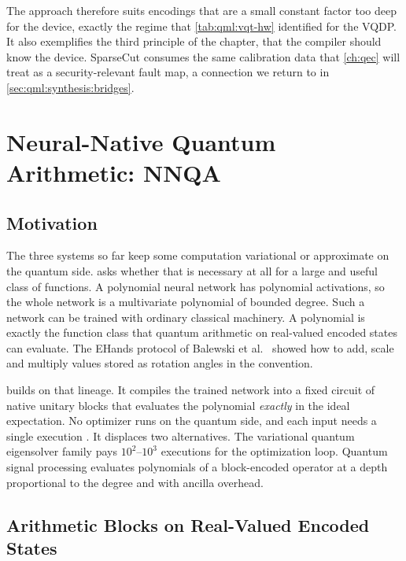 The approach therefore suits encodings that are a small constant factor too deep for the device, exactly the regime that \cref{tab:qml:vqt-hw} identified for the VQDP. It also exemplifies the third principle of the chapter, that the compiler should know the device. SparseCut consumes the same calibration data that \cref{ch:qec} will treat as a security-relevant fault map, a connection we return to in \cref{sec:qml:synthesis:bridges}.

\section{Neural-Native Quantum Arithmetic: NNQA}\label{sec:qml:nnqa}

\subsection{Motivation}\label{sec:qml:nnqa:motivation}

The three systems so far keep some computation variational or approximate on the quantum side. \nnqa{} asks whether that is necessary at all for a large and useful class of functions. A polynomial neural network has polynomial activations, so the whole network is a multivariate polynomial of bounded degree. Such a network can be trained with ordinary classical machinery. A polynomial is exactly the function class that quantum arithmetic on real-valued encoded states can evaluate. The EHands protocol of Balewski et al.~\cite{balewski2025ehands} showed how to add, scale and multiply values stored as rotation angles in the \qcrank{} convention.

\nnqa{} builds on that lineage. It compiles the trained network into a fixed circuit of native unitary blocks that evaluates the polynomial \emph{exactly} in the ideal expectation. No optimizer runs on the quantum side, and each input needs a single execution \cite{guo2026nnqa}. It displaces two alternatives. The variational quantum eigensolver family \cite{peruzzo2014vqe,cerezo2021vqa} pays $10^2$--$10^3$ executions for the optimization loop. Quantum signal processing \cite{low2017qsp,gilyen2019qsvt} evaluates polynomials of a block-encoded operator at a depth proportional to the degree and with ancilla overhead.

\subsection{Arithmetic Blocks on Real-Valued Encoded States}\label{sec:qml:nnqa:blocks}

